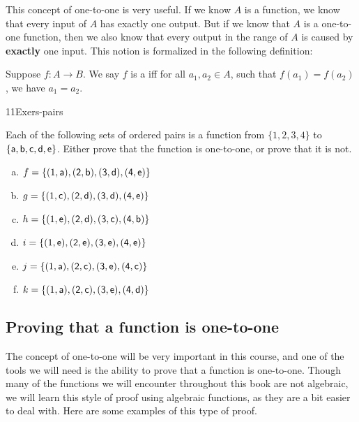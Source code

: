 This concept of one-to-one is very useful.  If we know $A$ is a function, we know that every input of $A$ has exactly one output.  But if we know that $A$ is a one-to-one function, then we also know that every output in the range of $A$ is caused by \textbf{exactly} one input.  This notion is formalized in the following definition:

\begin{defn} \label{121defn}
Suppose $f \colon A \to B$. We say $f$ is a  iff for all $a_1,a_2 \in A$, such that
$f(a_1) = f(a_2)$, we have $a_1 = a_2$. 
\end{defn}

\begin{exercise}{11Exers-pairs}
 
 Each of the following sets of ordered pairs is a function from $\{1,2,3,4\}$ to $\{\sf{a},\sf{b},\sf{c},\sf{d},\sf{e}\}$. Either prove that the function is one-to-one, or prove that it is not.
\begin{multicols}{2}
\begin{enumerate}[(a)]
\item  \label{11Exers-pairs-f}
$f = \{ (1,\sf{a}), (2,\sf{b}), (3,\sf{d}), (4,\sf{e})\}$
\item  \label{11Exers-pairs-g}
$g = \{ (1,\sf{c}), (2,\sf{d}), (3,\sf{d}), (4,\sf{e})\}$
\item  \label{11Exers-pairs-h}
$h = \{ (1,\sf{e}), (2,\sf{d}), (3,\sf{c}), (4,\sf{b})\}$
\item  \label{11Exers-pairs-i}
$i = \{ (1,\sf{e}), (2,\sf{e}), (3,\sf{e}), (4,\sf{e})\}$
\item  \label{11Exers-pairs-j}
$j = \{ (1,\sf{a}), (2,\sf{c}), (3,\sf{e}), (4,\sf{c})\}$
\item  \label{11Exers-pairs-k}
$k = \{ (1,\sf{a}), (2,\sf{c}), (3,\sf{e}), (4,\sf{d})\}$
\end{enumerate}
\end{multicols}
\end{exercise}

\subsection{Proving that a function is one-to-one}

The concept of one-to-one will be very important in this course, and one of the tools we will need is the ability to prove that a function is one-to-one.  Though many of the functions we will encounter throughout this book are not algebraic, we will learn this style of proof using algebraic functions, as they are a bit easier to deal with.  Here are some examples of this type of proof. 

